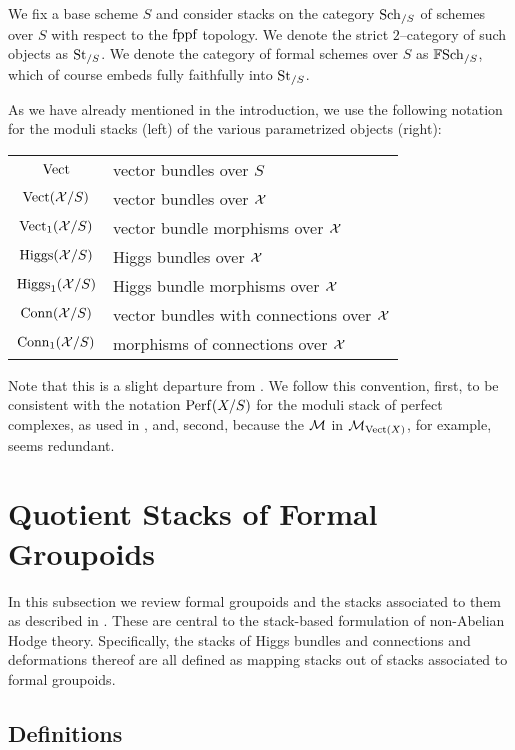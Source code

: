 \documentclass[11pt]{amsart}
\begin{document}
We fix a base scheme $S$ and consider stacks on the category $\mathrm{Sch}_{/S}$ of
schemes over $S$ with respect to the $\text{fppf}$ topology.
We denote the strict $2$--category of such objects as $\mathrm{St}_{/S}$.
We denote the category of formal schemes over $S$ as $\mathbb{F}\mathrm{Sch}_{/S}$, which
of course embeds fully faithfully into $\mathrm{St}_{/S}$.

As we have already mentioned in the introduction, we use the following
notation for the moduli stacks (left) of the various parametrized
objects (right):
\begin{center}
\begin{tabular}{c l}
$\mathrm{Vect}$ & vector bundles over $S$ \\
$\mathrm{Vect}(\mathcal{X}/S)$ & vector bundles over $\mathcal{X}$ \\
$\mathrm{Vect}_1(\mathcal{X}/S)$ & vector bundle morphisms over $\mathcal{X}$ \\
$\mathrm{Higgs}(\mathcal{X}/S)$ & Higgs bundles over $\mathcal{X}$ \\
$\mathrm{Higgs}_1(\mathcal{X}/S)$ & Higgs bundle morphisms over $\mathcal{X}$ \\
$\mathrm{Conn}(\mathcal{X}/S)$ & vector bundles with connections over $\mathcal{X}$ \\
$\mathrm{Conn}_1(\mathcal{X}/S)$ & morphisms of connections over $\mathcal{X}$
\end{tabular}
\end{center}
Note that this is a slight departure from \cite{ModQuivBun}. We follow this
convention, first, to be consistent with the notation $\mathrm{Perf}(X/S)$
for the moduli stack of perfect complexes, as used in \cite{GeomNonAbHodgeFilt},
and, second, because the $\mathcal{M}$ in $\mathcal{M}_{\mathrm{Vect}(X)}$, for example,
seems redundant.

\section{Quotient Stacks of Formal Groupoids}

In this subsection we review formal groupoids and the stacks associated
to them as described in \cite[\S 3.1]{GeomNonAbHodgeFilt}. These are central
to the stack-based formulation of non-Abelian Hodge theory. Specifically,
the stacks of Higgs bundles and connections and deformations thereof
are all defined as mapping stacks out of stacks associated to formal
groupoids.

\subsection{Definitions}
\end{document}
